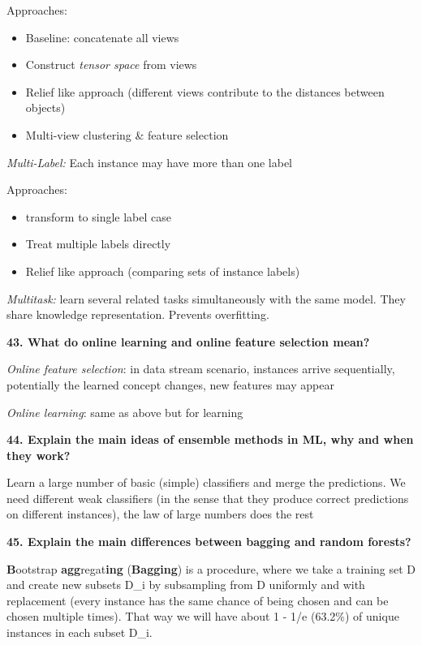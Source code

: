 Approaches:

\begin{itemize}
\item Baseline: concatenate all views
\item Construct \emph{tensor space} from views
\item Relief like approach (different views contribute to the distances
  between objects)
\item Multi-view clustering \& feature selection
\end{itemize}

\textit{Multi-Label:} Each instance may have more than one label

Approaches:

\begin{itemize}
\item transform to single label case
\item Treat multiple labels directly
\item Relief like approach (comparing sets of instance labels)
\end{itemize}

\textit{Multitask:} learn several related tasks simultaneously with
the same model. They share knowledge representation. Prevents
overfitting.

\textbf{43. What do online learning and online feature selection mean?}

\textit{Online feature selection}: in data stream scenario, instances
arrive sequentially, potentially the learned concept changes, new
features may appear

\textit{Online learning}: same as above but for learning

\textbf{44. Explain the main ideas of ensemble methods in ML, why and
when they work?}

Learn a large number of basic (simple) classifiers and merge the
predictions. We need different weak classifiers (in the sense that they
produce correct predictions on different instances), the law of large
numbers does the rest

\textbf{45. Explain the main differences between bagging and random
forests?}

\textbf{B}ootstrap \textbf{agg}regat\textbf{ing} (\textbf{Bagging}) is a
procedure, where we take a training set D and create new subsets D\_i by
subsampling from D uniformly and with replacement (every instance has
the same chance of being chosen and can be chosen multiple times). That
way we will have about 1 - 1/e (63.2\%) of unique instances in each
subset D\_i.

